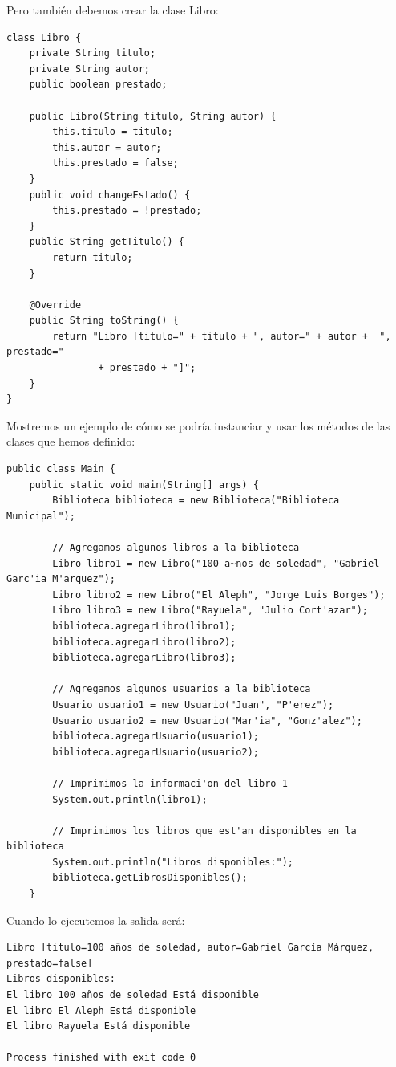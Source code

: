 \documentclass[executivepaper]{article}
\begin{document}
Pero también debemos crear la clase Libro:
\begin{lstlisting}
class Libro {
    private String titulo;
    private String autor;
    public boolean prestado;

    public Libro(String titulo, String autor) {
        this.titulo = titulo;
        this.autor = autor;
        this.prestado = false;
    }
    public void changeEstado() {
        this.prestado = !prestado;
    }
    public String getTitulo() {
        return titulo;
    }

    @Override
    public String toString() {
        return "Libro [titulo=" + titulo + ", autor=" + autor +  ", prestado="
                + prestado + "]";
    }
}
\end{lstlisting}

Mostremos un ejemplo de cómo se podría instanciar y usar los métodos de las clases que hemos definido:
\begin{lstlisting}
public class Main {
    public static void main(String[] args) {
        Biblioteca biblioteca = new Biblioteca("Biblioteca Municipal");

        // Agregamos algunos libros a la biblioteca
        Libro libro1 = new Libro("100 a~nos de soledad", "Gabriel Garc'ia M'arquez");
        Libro libro2 = new Libro("El Aleph", "Jorge Luis Borges");
        Libro libro3 = new Libro("Rayuela", "Julio Cort'azar");
        biblioteca.agregarLibro(libro1);
        biblioteca.agregarLibro(libro2);
        biblioteca.agregarLibro(libro3);

        // Agregamos algunos usuarios a la biblioteca
        Usuario usuario1 = new Usuario("Juan", "P'erez");
        Usuario usuario2 = new Usuario("Mar'ia", "Gonz'alez");
        biblioteca.agregarUsuario(usuario1);
        biblioteca.agregarUsuario(usuario2);

        // Imprimimos la informaci'on del libro 1
        System.out.println(libro1);

        // Imprimimos los libros que est'an disponibles en la biblioteca
        System.out.println("Libros disponibles:");
        biblioteca.getLibrosDisponibles();
    }
\end{lstlisting}
Cuando lo ejecutemos la salida será:
\begin{verbatim}
Libro [titulo=100 años de soledad, autor=Gabriel García Márquez, prestado=false]
Libros disponibles:
El libro 100 años de soledad Está disponible
El libro El Aleph Está disponible
El libro Rayuela Está disponible

Process finished with exit code 0
\end{verbatim}
\end{document}
